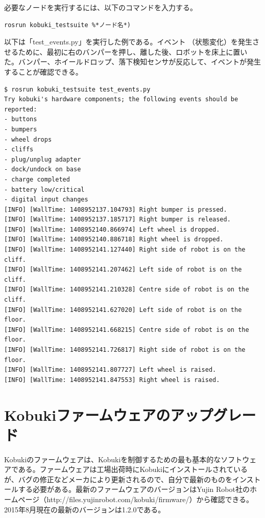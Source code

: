 \begin{itemize}
必要なノードを実行するには、以下のコマンドを入力する。

\begin{lstlisting}[language=ROS]
rosrun kobuki_testsuite %*ノード名*)
\end{lstlisting}

以下は「test\_events.py」を実行した例である。イベント  （状態変化）を発生させるために、最初に右のバンパーを押し、離した後、ロボットを床上に置いた。バンパー、ホイールドロップ、落下検知センサが反応して、イベントが発生することが確認できる。

\begin{lstlisting}[language=ROS]
$ rosrun kobuki_testsuite test_events.py
Try kobuki's hardware components; the following events should be reported:
- buttons
- bumpers
- wheel drops
- cliffs
- plug/unplug adapter
- dock/undock on base
- charge completed
- battery low/critical
- digital input changes
[INFO] [WallTime: 1408952137.104793] Right bumper is pressed.
[INFO] [WallTime: 1408952137.185717] Right bumper is released.
[INFO] [WallTime: 1408952140.866974] Left wheel is dropped.
[INFO] [WallTime: 1408952140.886718] Right wheel is dropped.
[INFO] [WallTime: 1408952141.127440] Right side of robot is on the cliff.
[INFO] [WallTime: 1408952141.207462] Left side of robot is on the cliff.
[INFO] [WallTime: 1408952141.210328] Centre side of robot is on the cliff.
[INFO] [WallTime: 1408952141.627020] Left side of robot is on the floor.
[INFO] [WallTime: 1408952141.668215] Centre side of robot is on the floor.
[INFO] [WallTime: 1408952141.726817] Right side of robot is on the floor.
[INFO] [WallTime: 1408952141.807727] Left wheel is raised.
[INFO] [WallTime: 1408952141.847553] Right wheel is raised.
\end{lstlisting}

\section{Kobukiファームウェアのアップグレード}

Kobukiのファームウェアは、Kobukiを制御するための最も基本的なソフトウェアである。ファームウェアは工場出荷時にKobukiにインストールされているが、バグの修正などメーカにより更新されるので、自分で最新のものをインストールする必要がある。最新のファームウェアのバージョンはYujin Robot社のホームページ（http://files.yujinrobot.com/kobuki/firmware/）から確認できる。2015年8月現在の最新のバージョンは1.2.0である。


\end{itemize}
